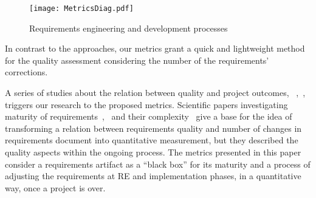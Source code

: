 \begin{figure}[H]
	\centering
		\texttt{[image: MetricsDiag.pdf]}
	\caption{Requirements engineering and development processes}
	\label{fig:Metrics_shot}
\end{figure}

In contrast to the approaches, our metrics grant a quick and lightweight method for the quality assessment considering the number of the requirements' corrections.

A series of studies about the relation between quality and project outcomes, ~\cite{Verner:2005},~\cite{Kamata:2007},~\cite{Noorwali:2015} triggers our research to the proposed metrics. Scientific papers investigating maturity of requirements~\cite{Basili:1981},~\cite{FARBEY:1990} and their complexity~\cite{Antinyan:2016} give a base for the idea of transforming a relation between requirements quality and number of changes in requirements document into quantitative measurement, but they described the quality aspects within the ongoing process. The metrics presented in this paper consider a requirements artifact as a ``black box'' for its maturity and a process of adjusting the requirements at RE and implementation phases, in a quantitative way, once a project is over.

%
%
%
